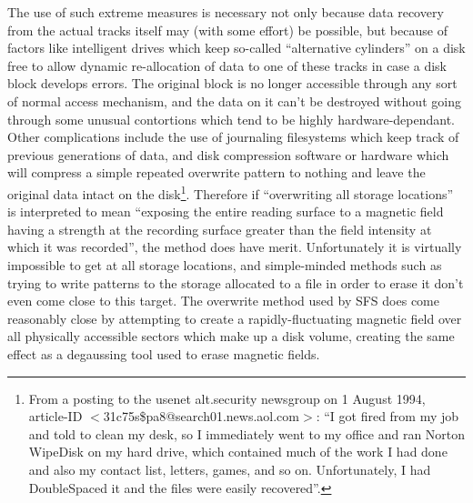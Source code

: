 The use of such extreme measures is necessary not only because data recovery 
from the actual tracks itself may (with some effort) be possible, but because 
of factors like intelligent drives which keep so-called ``alternative cylinders'' 
on a disk free to allow dynamic re-allocation of data to one of these tracks in 
case a disk block develops errors.  The original block is no longer accessible 
through any sort of normal access mechanism, and the data on it can't be 
destroyed without going through some unusual contortions which tend to be 
highly hardware-dependant.  Other complications include the use of journaling
filesystems which keep track of previous generations of data, and disk
compression software or hardware which will compress a simple repeated
overwrite pattern to nothing and leave the original data intact on the disk\footnote{
               \hspace*{5pt} From a posting to the usenet alt.security newsgroup on 1 August
               1994, article-ID $<$31c75s\$pa8@search01.news.aol.com$>$: ``I got fired
               from my job and told to clean my desk, so I immediately went to
               my office and ran Norton WipeDisk on my hard drive, which
               contained much of the work I had done and also my contact list,
               letters, games, and so on.  Unfortunately, I had DoubleSpaced it
               and the files were easily recovered''.
}.
Therefore if ``overwriting all storage locations'' is interpreted to mean
``exposing the entire reading surface to a magnetic field having a strength at
the recording surface greater than the field intensity at which it was
recorded'', the method does have merit.  Unfortunately it is virtually
impossible to get at all storage locations, and simple-minded methods such as
trying to write patterns to the storage allocated to a file in order to erase
it don't even come close to this target.  The overwrite method used by SFS does
come reasonably close by attempting to create a rapidly-fluctuating magnetic
field over all physically accessible sectors which make up a disk volume,
creating the same effect as a degaussing tool used to erase magnetic fields.

